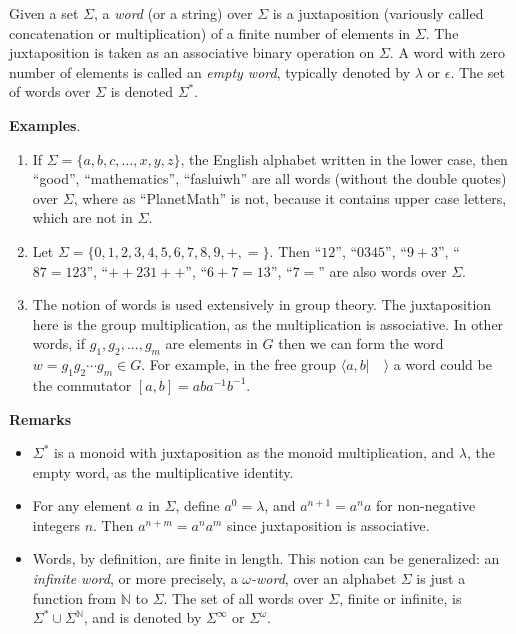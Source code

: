 \documentclass[12pt]{article}
\begin{document}

Given a set $\Sigma$, a \emph{word} (or a string) over $\Sigma$ is a juxtaposition (variously called concatenation or multiplication) of a finite number of elements in $\Sigma$.  The juxtaposition is taken as an associative binary operation on $\Sigma$.   A word with zero number of elements is called an \emph{empty word}, typically denoted by $\lambda$ or $\epsilon$.  The set of words over $\Sigma$ is denoted $\Sigma^*$.

\textbf{Examples}.  
\begin{enumerate}
\item
If $\Sigma = \lbrace a,b,c,\ldots, x,y,z\rbrace$, the English alphabet written in the lower case, then ``good'', ``mathematics'', ``fasluiwh'' are all words (without the double quotes) over $\Sigma$, where as ``PlanetMath'' is not, because it contains upper case letters, which are not in $\Sigma$.  
\item
Let $\Sigma=\lbrace 0,1,2,3,4,5,6,7,8,9,+,=\rbrace$.  Then ``$12$'', ``$0345$'', ``$9+3$'', ``$87=123$'', ``$++231++$'', ``$6+7=13$'', ``$7=$'' are also words over $\Sigma$.
\item
The notion of words is used extensively in group theory.  The juxtaposition here is the group multiplication, as the multiplication is associative.  In other words, if $g_1,g_2,...,g_m$ are elements in $G$ then we can form the word $w=g_1g_2\cdots g_m\in G$.  For example, in the free group $\langle a,b|\quad\rangle$ a word could be the commutator $[a,b]=aba^{-1}b^{-1}$.
\end{enumerate}

\textbf{Remarks}  
\begin{itemize}
\item
$\Sigma^*$ is a monoid with juxtaposition as the monoid multiplication, and $\lambda$, the empty word, as the multiplicative identity.
\item
For any element $a$ in $\Sigma$, define $a^0=\lambda$, and $a^{n+1}=a^na$ for non-negative integers $n$.  Then $a^{n+m}=a^na^m$ since juxtaposition is associative.
\item
Words, by definition, are finite in length.  This notion can be generalized: an \emph{infinite word}, or more precisely, a \emph{$\omega$-word}, over an alphabet $\Sigma$ is just a function from $\mathbb{N}$ to $\Sigma$.  The set of all words over $\Sigma$, finite or infinite, is $\Sigma^* \cup \Sigma^{\mathbb{N}}$, and is denoted by $\Sigma^{\infty}$ or $\Sigma^{\omega}$.
\end{itemize}
\end{document}
